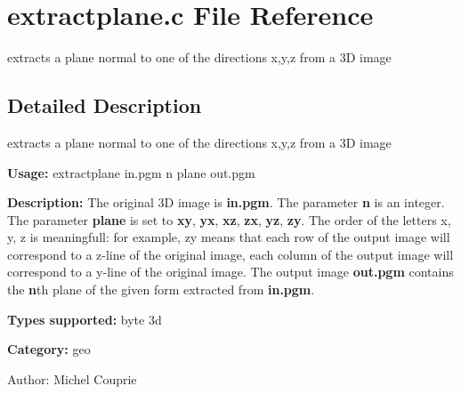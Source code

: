 \section{extractplane.c File Reference}
\label{extractplane_8c}
extracts a plane normal to one of the directions x,y,z from a 3D image  




\label{_details}
\subsection{Detailed Description}
extracts a plane normal to one of the directions x,y,z from a 3D image 

{\bf Usage:} extractplane in.pgm n plane out.pgm

{\bf Description:} The original 3D image is {\bf in.pgm}. The parameter {\bf n} is an integer. The parameter {\bf plane} is set to {\bf xy}, {\bf yx}, {\bf xz}, {\bf zx}, {\bf yz}, {\bf zy}. The order of the letters x, y, z is meaningfull: for example, zy means that each row of the output image will correspond to a z-line of the original image, each column of the output image will correspond to a y-line of the original image. The output image {\bf out.pgm} contains the {\bf n}th plane of the given form extracted from {\bf in.pgm}.

{\bf Types supported:} byte 3d

{\bf Category:} geo

\begin{Desc}
\item[Author:]Michel Couprie \end{Desc}
